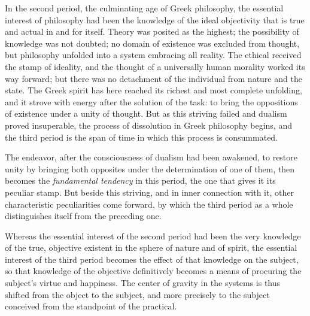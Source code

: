 In the second period, the culminating age of Greek philosophy, the essential
interest of philosophy had been the knowledge of the ideal objectivity that is
true and actual in and for itself. Theory was posited as the highest; the
possibility of knowledge was not doubted; no domain of existence was excluded
from thought, but philosophy unfolded into a system embracing all reality. The
ethical received the stamp of ideality, and the thought of a universally human
morality worked its way forward; but there was no detachment of the individual
from nature and the state. The Greek spirit has here reached its richest and
most complete unfolding, and it strove with energy after the solution of the
task: to bring the oppositions of existence under a unity of
thought. But as this striving failed and dualism proved insuperable, the
process of dissolution in Greek philosophy begins, and the third period is the
span of time in which this process is consummated.

The endeavor, after the consciousness of dualism had been awakened, to restore
unity by bringing both opposites under the determination of one of them, then
becomes the \emph{fundamental tendency} in this period, the one that gives it
its peculiar stamp. But beside this striving, and in inner connection with it,
other characteristic peculiarities come forward, by which the third period as
a whole distinguishes itself from the preceding one.

Whereas the essential interest of the second period had been the very
knowledge of the true, objective existent in the sphere of nature and of
spirit, the essential interest of the third period becomes the effect of that
knowledge on the subject, so that knowledge of the objective definitively
becomes a means of procuring the subject's virtue and happiness. The center of
gravity in the systems is thus shifted from the object to the subject, and
more precisely to the subject conceived from the standpoint of the practical.

